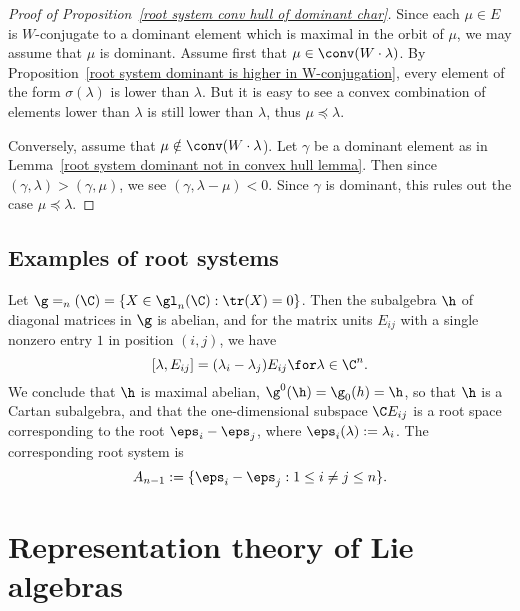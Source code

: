 \begin{proof}[Proof of Proposition~\ref{root system conv hull of dominant char}]
Since each $\mu\in E$ is $W$-conjugate to a dominant element which is maximal in the orbit of $\mu$, we may assume that $\mu$ is dominant. Assume first that $\mu\in\conv(W\cdot\lambda)$. By Proposition~\ref{root system dominant is higher in W-conjugation}, every element of the form $\sigma(\lambda)$ is lower than $\lambda$. But it is easy to see a convex combination of elements lower than $\lambda$ is still lower than $\lambda$, thus $\mu\preceq\lambda$.\par
Conversely, assume that $\mu\notin\conv(W\cdot\lambda$). Let $\gamma$ be a dominant element as in Lemma~\ref{root system dominant not in convex hull lemma}. Then since $(\gamma,\lambda)>(\gamma,\mu)$, we see $(\gamma,\lambda-\mu)<0$. Since $\gamma$ is dominant, this rules out the case $\mu\preceq\lambda$.
\end{proof}
\subsection{Examples of root systems}
\begin{example}
Let $\g=\sl_n(\C)=\{X\in\gl_n(\C):\tr(X)=0\}$. Then the subalgebra $\h$ of diagonal matrices in $\g$ is abelian, and for the matrix units $E_{ij}$ with a single nonzero entry $1$ in position $(i,j)$, we have
\[[\lambda,E_{ij}]=(\lambda_i-\lambda_j)E_{ij}\for\lambda\in\C^n.\]
We conclude that $\h$ is maximal abelian, $\g^0(\h)=\g_0(h)=\h$, so that $\h$ is a Cartan subalgebra, and that the one-dimensional subspace $\C E_{ij}$ is a root space corresponding to the root $\eps_i-\eps_j$, where $\eps_i(\lambda):=\lambda_i$. The corresponding root system is
\[A_{n-1}:=\{\eps_i-\eps_j:1\leq i\neq j\leq n\}.\]
\end{example}
\section{Representation theory of Lie algebras}
